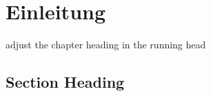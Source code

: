 \chapter{Einleitung}
\label{intro} %
 adjust the chapter heading in the running head



\section{Section Heading}
